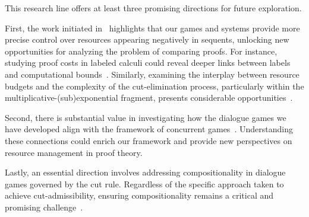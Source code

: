 
This research line offers at least three promising directions for future exploration.

First, the work initiated in~\cite{DBLP:conf/tableaux/LangOPF19} highlights that our games and systems provide more precise control over resources appearing negatively in sequents, unlocking new opportunities for analyzing the problem of comparing proofs. For instance, studying proof costs in labeled calculi could reveal deeper links between labels and computational bounds~\cite{DBLP:journals/jfp/AccattoliGK20}. Similarly, examining the interplay between resource budgets and the complexity of the cut-elimination process, particularly within the multiplicative-(sub)exponential fragment, presents considerable opportunities~\cite{DBLP:journals/tcs/Strassburger03,DBLP:journals/tocl/StrassburgerG11}.

Second, there is substantial value in investigating how the dialogue games we
have developed align with the framework of concurrent
games~\cite{DBLP:conf/lics/AbramskyM99,DBLP:conf/lics/FaggianM05,DBLP:journals/lmcs/CastellanCRW17}.
Understanding these connections could enrich our framework and provide new
perspectives on resource management in proof theory.

Lastly, an essential direction involves addressing compositionality in dialogue games governed by the cut rule. Regardless of the specific approach taken to achieve cut-admissibility, ensuring compositionality remains a critical and promising challenge~\cite{dutilh18}.
